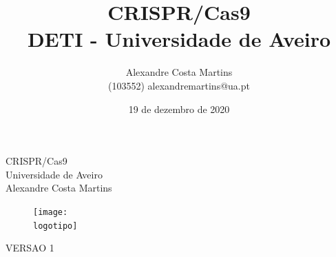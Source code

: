 \documentclass{report}
\begin{document}
%
\def\titulo{CRISPR/Cas9}
\def\data{19 de dezembro de 2020}
\def\autores{Alexandre Costa Martins }
\def\autorescontactos{(103552) alexandremartins@ua.pt}
\def\versao{VERSAO 1}
\def\departamento{DETI - Universidade de Aveiro}
\def\empresa{Universidade de Aveiro}
\def\logotipo{ua.pdf}
%
%

\renewcommand{\contentsname}{Índice}
\begin{titlepage}

\begin{center}
%
\vspace*{0mm}
%
{\Huge \titulo}\\ 
%
\vspace{50mm}
%
{\Large \empresa}\\
%
\vspace{10mm}
%
{\LARGE \autores}\\ 
%
\vspace{30mm}
%
\begin{figure}[h]
\center
\texttt{[image: \\logotipo]}
\end{figure}
%
\vspace{30mm}
\end{center}
%
\begin{flushright}
\versao
\end{flushright}
\end{titlepage}

\title{%
{\Huge\textbf{\titulo}}\\
{\Large \departamento}
}
%
\author{%
    \autores \\
    \autorescontactos
}
%
\date{\data}
%
\maketitle

\end{document}
